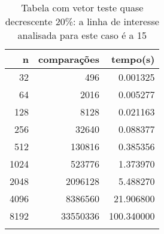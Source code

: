 \begin{table}[ht]
\centering
\begin{tabular}{rrr} \toprule
        n &    comparações &       tempo(s) \\ \midrule
      32  &            496 &      0.001325 \\
      64  &           2016 &      0.005277 \\
     128  &           8128 &      0.021163 \\
     256  &          32640 &      0.088377 \\
     512  &         130816 &      0.385356 \\
    1024  &         523776 &      1.373970 \\
    2048  &        2096128 &      5.488270 \\
    4096  &        8386560 &     21.906800 \\
    8192  &       33550336 &    100.340000 \\
\bottomrule\addlinespace
\end{tabular}
\caption{Tabela com vetor teste quase decrescente 20\%: a linha de interesse analisada para este caso é a 15}
\label{tab:bolhaQuaseDecresc20}
\end{table}
